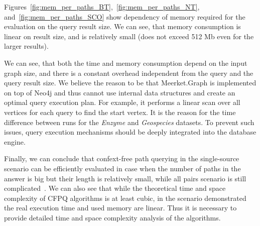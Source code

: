 Figures~\ref{fig:mem_per_paths_BT},~\ref{fig:mem_per_paths_NT}, and~\ref{fig:mem_per_paths_SCO} show dependency of memory required for the evaluation on the query result size.
We can see, that memory consumption is linear on result size, and is relatively small (does not exceed 512 Mb even for the larger results).

We can see, that both the time and memory consumption depend on the input graph size, and there is a constant overhead independent from the query and the query result size.
We believe the reason to be that Meerket.Graph is implemented on top of Neo4j and thus cannot use internal data structures and create an optimal query execution plan.
For example, it performs a linear scan over all vertices for each query to find the start vertex.
It is the reason for the time difference between runs for the \emph{Enzyme} and \emph{Geospecies} datasets.
To prevent such issues, query execution mechanisms should be deeply integrated into the database engine.

Finally, we can conclude that confext-free path querying in the single-source scenario can be efficiently evaluated in case when the number of paths in the  answer is big but their length is relatively small, while all pairs scenario is still complicated~\cite{10.1145/3335783.3335791}.
We can also see that while the theoretical time and space complexity of CFPQ algorithms is at least cubic, in the scenario demonstrated the real execution time and used memory are linear.
Thus it is necessary to provide detailed time and space complexity analysis of the algorithms.
